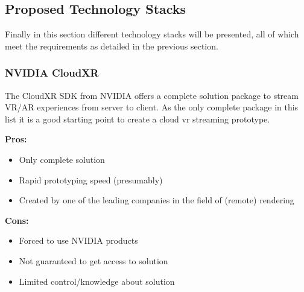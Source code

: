 \newpage
\subsection{Proposed Technology Stacks}
Finally in this section different technology stacks will be presented, all of which meet the requirements as detailed in the previous section.
\subsubsection{NVIDIA CloudXR}
The CloudXR SDK from NVIDIA offers a complete solution package to stream VR/AR experiences from server to client. As the only complete package in this list it is a good starting point to create a cloud \acrshort{vr} streaming prototype. \\
\newline
\begin{varwidth}[t]{.5\textwidth}
\renewcommand\labelitemi{+}
\textbf{Pros:}
\begin{itemize}
\item Only complete solution
\item Rapid prototyping speed (presumably)
\item Created by one of the leading companies in the field of (remote) rendering
\end{itemize}
\end{varwidth}
\hspace{4em}
\begin{varwidth}[t]{.5\textwidth}
\renewcommand\labelitemi{-}
\textbf{Cons:}
\begin{itemize}
\item Forced to use NVIDIA products
\item Not guaranteed to get access to solution
\item Limited control/knowledge about solution
\end{itemize}
\end{varwidth}